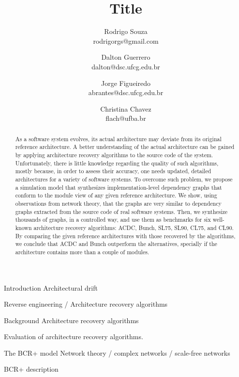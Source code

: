 \documentclass[12pt,a4paper,english]{article}
\title{
Title}
\author{Rodrigo Souza \\ rodrigorgs@gmail.com 
\and Dalton Guerrero \\ dalton@dsc.ufcg.edu.br
\and Jorge Figueiredo \\ abrantes@dsc.ufcg.edu.br
\and Christina Chavez \\ flach@ufba.br
}
\begin{document}
\sloppy
\maketitle

\begin{abstract}
	As a software system evolves, its actual architecture may deviate from its original reference architecture. A better understanding of the actual architecture can be gained by applying architecture recovery algorithms to the source code of the system. Unfortunately, there is little knowledge regarding the quality of such algorithms, mostly because, in order to assess their accuracy, one needs updated, detailed architectures for a variety of software systems.
	To overcome such problem, we propose a simulation model that synthesizes implementation-level dependency graphs that conform to the module view of any given reference architecture. We show, using observations from network theory, that the graphs are very similar to dependency graphs extracted from the source code of real software systems. 
	Then, we synthesize thousands of graphs, in a controlled way, and use them as benchmarks for six well-known architecture recovery algorithms: ACDC, Bunch, SL75, SL90, CL75, and CL90. By comparing the given reference architectures with those recovered by the algorithms, we conclude that ACDC and Bunch outperform the alternatives, specially if the architecture contains more than a couple of modules.\end{abstract}


\begin{section}{Introduction}
	Architectural drift

	Reverse engineering / Architecture recovery algorithms
	
\end{section}

\begin{section}{Background}
	Architecture recovery algorithms

	Evaluation of architecture recovery algorithms. 
	
\end{section}

\begin{section}{The BCR+ model}
	Network theory / complex networks / scale-free networks
	
	BCR+ description \cite{Bollobas2003}
\end{section}
\end{document}
